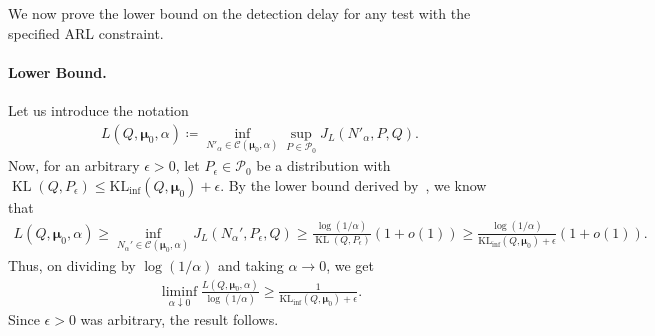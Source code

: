 \documentclass{article}
\theoremstyle{plain}
\theoremstyle{definition}
\newcommand{\KLinf}{\operatorname{KL_{inf}}}
\newcommand{\KL}{\operatorname{KL}}
\newcommand{\calP}{\mathcal P}
\newcommand{\calC}{\mathcal C}
\newcommand{\boldmu}{\boldsymbol{\mu}}
\begin{document}
We now prove the lower bound on the detection delay for any test with the specified ARL constraint.
\paragraph{Lower Bound.} Let us introduce the notation 
\begin{align}
L(Q, \boldmu_0, \alpha) \coloneqq \inf_{N'_\alpha \in \calC(\boldmu_0, \alpha)} \sup_{P \in \calP_0} J_L(N'_\alpha, P, Q). 
\end{align}
Now, for an arbitrary $\epsilon >0$, let $P_\epsilon \in  \calP_0$ be a distribution with $\KL(Q, P_\epsilon) \leq \KLinf(Q, \boldmu_0) + \epsilon$. By the lower bound derived by~\citet[Theorem~3]{lorden1971procedures}, we know that 
\begin{align}
    L(Q, \boldmu_0, \alpha) \geq \inf_{N_\alpha' \in \calC(\boldmu_0, \alpha)} J_L(N_\alpha', P_\epsilon, Q) \geq \frac{\log(1/\alpha)}{\KL(Q, P_\epsilon)} \left(1 + o(1) \right) \geq \frac{\log(1/\alpha)}{\KLinf(Q, \boldmu_0) + \epsilon} \left(1 + o(1) \right). 
\end{align}
Thus, on dividing by $\log(1/\alpha)$ and taking $\alpha \to 0$, we get 
\begin{align}
    \liminf_{\alpha \downarrow 0} \frac{L(Q, \boldmu_0, \alpha)} {\log(1/\alpha)} \geq \frac{1}{\KLinf(Q, \boldmu_0) + \epsilon}. 
\end{align}
Since $\epsilon > 0$ was arbitrary, the result follows. 








  
\end{document}
